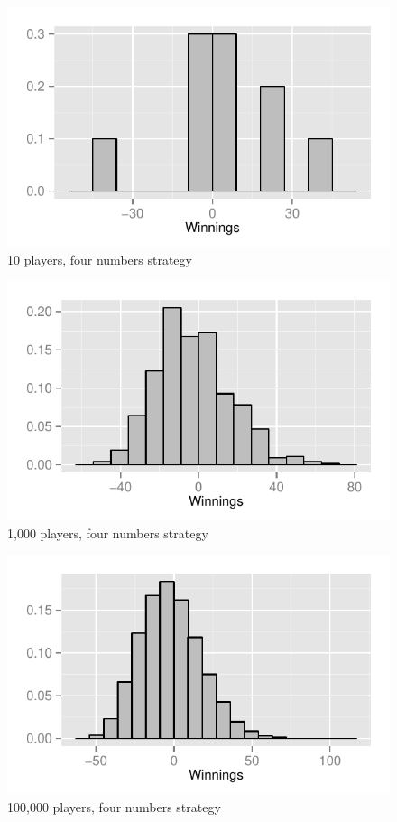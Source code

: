 \documentclass[landscape]{exam}
\begin{document}
  \begin{figure}[H]
    \centering
    \includegraphics[scale = 0.9]{figures/roulette/4_10_50_fraction.pdf}
    \caption{10 players, four numbers strategy}
  \end{figure}

  \begin{figure}[H]
    \centering
    \includegraphics[scale = 0.9]{figures/roulette/4_1000_50_fraction.pdf}
    \caption{1,000 players, four numbers strategy}
  \end{figure}

  \begin{figure}[H]
    \centering
    \includegraphics[scale = 0.9]{figures/roulette/4_100000_50_fraction.pdf}
    \caption{100,000 players, four numbers strategy}
  \end{figure}
\end{document}
